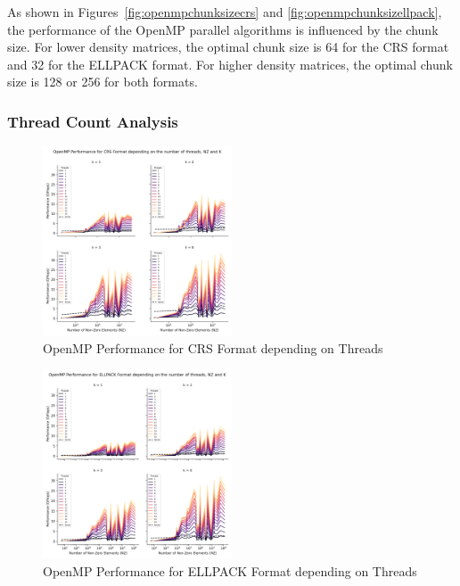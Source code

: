 \documentclass[12pt,oneside]{book} %
\begin{document}
As shown in Figures~\ref{fig:openmpchunksizecrs} and
\ref{fig:openmpchunksizellpack}, the performance of the OpenMP parallel
algorithms is influenced by the chunk size. For lower density matrices, the
optimal chunk size is 64 for the CRS format and 32 for the ELLPACK format. For
higher density matrices, the optimal chunk size is 128 or 256 for both formats.

\subsubsection{Thread Count Analysis}
\begin{figure}[H]
    \centering
    \includegraphics[width=0.5\textwidth]{../results/images/openMP_Threads_CRS.png}
    \caption{OpenMP Performance for CRS Format depending on Threads}
    \label{fig:openmpthreadscrs}
\end{figure}

\begin{figure}[H]
    \centering
    \includegraphics[width=0.5\textwidth]{../results/images/openMP_Threads_ELLPACK.png}
    \caption{OpenMP Performance for ELLPACK Format depending on Threads}
    \label{fig:openmpthreadsellpack}
\end{figure}
\end{document}
